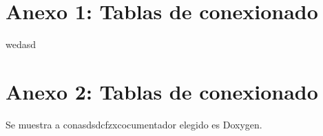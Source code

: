 \appendix

\chapter{Anexo 1: Tablas de conexionado}\label{aped.A}
wedasd

\chapter{Anexo 2: Tablas de conexionado}\label{aped.B}

{\Large Se muestra a conasdsdcfzxcocumentador elegido es Doxygen.}
